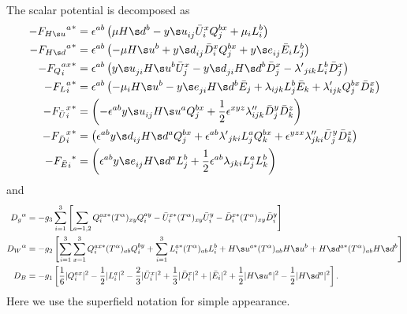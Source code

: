 The scalar potential is decomposed as
\begin{align}
-{{F_{\Hu}}^a}^*&= \epsilon^{ab}\left(
  \mu\Hd^b
- {y\s u}_{ij} \bU_i^xQ_j^{bx}
+ \mu_i L_i^b
\right)\\
-{{F_{\Hd}}^a}^*&= \epsilon^{ab}\left(
- \mu\Hu^b
+ {y\s d}_{ij} \bD_i^x Q_j^{bx}
+ {y\s e}_{ij} \bE_i   L_j^{b} 
\right)\\
-{{F_{Q}}^{ax}_i}^*&= \epsilon^{ab}\left(
{y\s u}_{ji} \Hu^{b} \bU_j^x
- {y\s d}_{ji} \Hd^{b} \bD_j^x
- {\lambda'}_{jik} L_i^b\bD_j^x
\right)\\
-{{F_{L}}^a_i}^*&= \epsilon^{ab}\left(
- \mu_i \Hu^b
- {y\s e}_{ji} \Hd^{b} \bE_j
+ \lambda_{ijk}L^b_j\bE_k
+ \lambda'_{ijk}Q_j^{bx}\bD_k^x
\right)\\
-{{F_{\bU}}^x_i}^*&=\left(
- \epsilon^{ab}{y\s u}_{ij}\Hu^a Q_j^{bx}
+ \frac12\epsilon^{xyz}\lambda''_{ijk}\bD_j^y\bD_k^z
\right)\\
-{{F_{\bD}}^x_i}^*&=\left(
  \epsilon^{ab}{y\s d}_{ij}\Hd^a Q_j^{bx}
+ \epsilon^{ab}{\lambda'}_{jki}L^a_j Q_k^{bx}
+ \epsilon^{yzx}\lambda''_{jki}\bU_j^y\bD_k^z
\right)\\
-{{F_{\bE}}_i}^*&=\left(
  \epsilon^{ab}{y\s e}_{ij}\Hd^a L_j^{b}
+ \frac12\epsilon^{ab}\lambda_{jki}L_j^aL_k^b
\right)
\end{align}
and
\begin{align}
 {D_{g}}^\alpha &= -g_3\sum_{i=1}^3\left[
  \sum_{a=1,2}Q_i^{ax*}(T^\alpha)_{xy}Q_i^{ay}
- \bU_i^{x*}(T^\alpha)_{xy}\bU_i^{y}
- \bD_i^{x*}(T^\alpha)_{xy}\bD_i^{y}
\right]\\
%
 {D_{W}}^\alpha &= -g_2\left[
  \sum_{i=1}^3\sum_{x=1}^3 Q_i^{ax*}(T^\alpha)_{ab}Q_i^{by}
+ \sum_{i=1}^3 L_i^{a*}(T^\alpha)_{ab} L_i^{b}
+ \Hu^{a*}(T^\alpha)_{ab}\Hu^b
+ \Hd^{a*}(T^\alpha)_{ab}\Hd^b
\right]\\
%
 {D_{B}} &= -g_1\left[
  \frac16|  Q_i^{ax}|^2
- \frac12|  L_i^{a} |^2
- \frac23|\bU_i^{x} |^2
+ \frac13|\bD_i^{x} |^2
+        |\bE_i     |^2
+ \frac12|\Hu  ^{a} |^2
- \frac12|\Hd  ^{a} |^2
\right].
\end{align}
Here we use the superfield notation for simple appearance.

